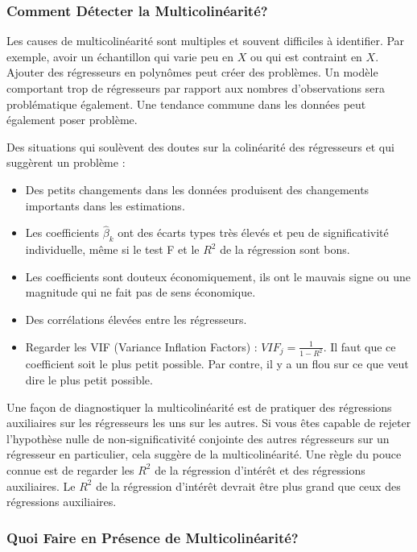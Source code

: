 \documentclass[14pt]{extarticle} %
\theoremstyle{definition}
\theoremstyle{plain}
\begin{document}
\subsubsection{Comment Détecter la Multicolinéarité?}

Les causes de multicolinéarité sont multiples et souvent difficiles à identifier. Par exemple, avoir un échantillon qui varie peu en $X$ ou qui est contraint en $X$. Ajouter des régresseurs en polynômes peut créer des problèmes. Un modèle comportant trop de régresseurs par rapport aux nombres d’observations sera problématique également. Une tendance commune dans les données peut également poser problème.

Des situations qui soulèvent des doutes sur la colinéarité des régresseurs et qui suggèrent un problème :
\begin{itemize}
    \item Des petits changements dans les données produisent des changements importants dans les estimations.
    \item Les coefficients $\hat{\beta}_k$ ont des écarts types très élevés et peu de significativité individuelle, même si le test F et le $R^2$ de la régression sont bons.
    \item Les coefficients sont douteux économiquement, ils ont le mauvais signe ou une magnitude qui ne fait pas de sens économique.
    \item Des corrélations élevées entre les régresseurs.
    \item Regarder les VIF (Variance Inflation Factors) : $VIF_j = \frac{1}{1 - R^2}$. Il faut que ce coefficient soit le plus petit possible. Par contre, il y a un flou sur ce que veut dire le plus petit possible.
\end{itemize}

Une façon de diagnostiquer la multicolinéarité est de pratiquer des régressions auxiliaires sur les régresseurs les uns sur les autres. Si vous êtes capable de rejeter l’hypothèse nulle de non-significativité conjointe des autres régresseurs sur un régresseur en particulier, cela suggère de la multicolinéarité. Une règle du pouce connue est de regarder les $R^2$ de la régression d’intérêt et des régressions auxiliaires. Le $R^2$ de la régression d’intérêt devrait être plus grand que ceux des régressions auxiliaires.

\subsubsection{Quoi Faire en Présence de Multicolinéarité?}
\end{document}
